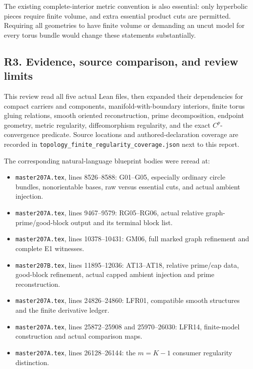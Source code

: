 \documentclass[
  letterpaper,
  11pt]{article}
\providecommand{\tightlist}{%
  \setlength{\itemsep}{0pt}\setlength{\parskip}{0pt}}
\begin{document}
The existing complete-interior metric convention is also essential: only
hyperbolic pieces require finite volume, and extra essential product
cuts are permitted. Requiring all geometries to have finite volume or
demanding an uncut model for every torus bundle would change these
statements substantially.

\subsection{R3. Evidence, source comparison, and review
limits}\label{topology-r3}

This review read all five actual Lean files, then expanded their
dependencies for compact carriers and components, manifold-with-boundary
interiors, finite torus gluing relations, smooth oriented
reconstruction, prime decomposition, endpoint geometry, metric
regularity, diffeomorphism regularity, and the exact \(C^p\)-convergence
predicate. Source locations and authored-declaration coverage are
recorded in
{\small\texttt{topology\_\allowbreak{}finite\_\allowbreak{}regularity\_\allowbreak{}coverage.\allowbreak{}json}}
next to this report.

The corresponding natural-language blueprint bodies were reread at:

\begin{itemize}
\tightlist
\item
  {\small\texttt{master207A.\allowbreak{}tex}}, lines 8526--8588:
  G01--G05, especially ordinary circle bundles, nonorientable bases, raw
  versus essential cuts, and actual ambient injection.
\item
  {\small\texttt{master207A.\allowbreak{}tex}}, lines 9467--9579:
  RG05--RG06, actual relative graph-prime/good-block output and its
  terminal block list.
\item
  {\small\texttt{master207A.\allowbreak{}tex}}, lines 10378--10431:
  GM06, full marked graph refinement and complete E1 witnesses.
\item
  {\small\texttt{master207B.\allowbreak{}tex}}, lines 11895--12036:
  AT13--AT18, relative prime/cap data, good-block refinement, actual
  capped ambient injection and prime reconstruction.
\item
  {\small\texttt{master207A.\allowbreak{}tex}}, lines 24826--24860:
  LFR01, compatible smooth structures and the finite derivative ledger.
\item
  {\small\texttt{master207A.\allowbreak{}tex}}, lines 25872--25908 and
  25970--26030: LFR14, finite-model construction and actual comparison
  maps.
\item
  {\small\texttt{master207A.\allowbreak{}tex}}, lines 26128--26144: the
  \(m=K-1\) consumer regularity distinction.
\end{itemize}
\end{document}
